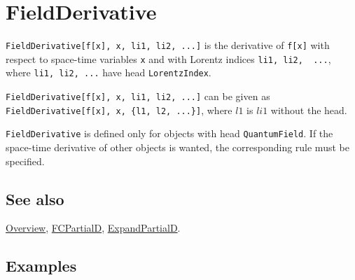 \documentclass[../FeynCalcManual.tex]{subfiles}
\begin{document}
\hypertarget{fieldderivative}{%
\section{FieldDerivative}\label{fieldderivative}}

\texttt{FieldDerivative[\allowbreak{}f[\allowbreak{}x],\ \allowbreak{}x,\ \allowbreak{}li1,\ \allowbreak{}li2,\ \allowbreak{}...]}
is the derivative of \texttt{f[\allowbreak{}x]} with respect to
space-time variables \texttt{x} and with Lorentz indices
\texttt{li1,\ \allowbreak{}li2,\ \allowbreak{} ...}, where
\texttt{li1,\ \allowbreak{}li2,\ \allowbreak{}...} have head
\texttt{LorentzIndex}.

\texttt{FieldDerivative[\allowbreak{}f[\allowbreak{}x],\ \allowbreak{}x,\ \allowbreak{}li1,\ \allowbreak{}li2,\ \allowbreak{}...]}
can be given as
\texttt{FieldDerivative[\allowbreak{}f[\allowbreak{}x],\ \allowbreak{}x,\ \allowbreak{}\{\allowbreak{}l1,\ \allowbreak{}l2,\ \allowbreak{}...\}]},
where \(l1\) is \(li1\) without the head.

\texttt{FieldDerivative} is defined only for objects with head
\texttt{QuantumField}. If the space-time derivative of other objects is
wanted, the corresponding rule must be specified.

\subsection{See also}

\hyperlink{toc}{Overview}, \hyperlink{fcpartiald}{FCPartialD},
\hyperlink{expandpartiald}{ExpandPartialD}.

\subsection{Examples}

\begin{Shaded}
\begin{Highlighting}[]
\OperatorTok{[}\OperatorTok{,} \OperatorTok{\{}\SpecialCharTok{\textbackslash{}}\OperatorTok{[}\OperatorTok{]\}][}\OperatorTok{]}\OperatorTok{[}\OperatorTok{,} \OperatorTok{\{}\SpecialCharTok{\textbackslash{}}\OperatorTok{[}\OperatorTok{]\}][}\OperatorTok{]}\OperatorTok{[}\OperatorTok{,} \OperatorTok{\{}\SpecialCharTok{\textbackslash{}}\OperatorTok{[}\OperatorTok{]\}][}\OperatorTok{]}\OperatorTok{[}\OperatorTok{,} \OperatorTok{\{}\SpecialCharTok{\textbackslash{}}\OperatorTok{[}\OperatorTok{]\}][}\OperatorTok{]}
\end{Highlighting}
\end{Shaded}
\end{document}
